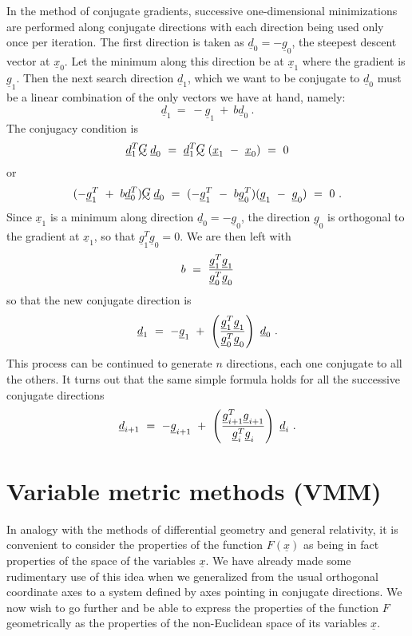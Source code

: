      In the method of conjugate gradients, successive one-dimensional
minimizations are performed along conjugate directions with each direction being used only once per iteration.  The first direction is taken
as ${\underline{d}}_0 = -{\underline{g}}_0$, the steepest descent vector at ${\underline{x}}_0$. 
Let the minimum along this direction be at ${\underline{x}}_1$ where the gradient is
${\underline{g}}_1$.  Then the next  search direction ${\underline{d}}_1$, which we want to be
conjugate to ${\underline{d}}_0$ must be a linear combination of the only vectors we have at hand,
namely:
 $${\underline{d}}_1~=~-{\underline{g}}_1~+~b{\underline{d}}_0~.$$
The conjugacy condition is
 $${\underline{d}}_1^T\UTG{\underline{d}}_0~=~{\underline{d}}_1^T\UTG({\underline{x}}_1~-~
{\underline{x}}_0)~=~0$$
or
$$(-{\underline{g}}_1^T~+~b{\underline{d}}_0^T)\UTG{\underline{d}}_0~=~
(-{\underline{g}}_1^T~-~b{\underline{g}}_0^T)({\underline{g}}_1~-~{\underline{g}}_0)~=~0~.$$
Since ${\underline{x}}_1$ is a minimum along direction ${\underline{d}}_0 = -{\underline{g}}_0$, the
direction ${\underline{g}}_0$ is orthogonal to the gradient at ${\underline{x}}_1$,
 so that ${\underline{g}}_1^T{\underline{g}}_0 = 0$.  We are then left with
 $$b~=~{{\underline{g}}_1^T{\underline{g}}_1\over {\underline{g}}_0^T{\underline{g}}_0}$$
 so that the new conjugate direction is
 $${\underline{d}}_1~=~-{\underline{g}}_1~+~\left(
{{\underline{g}}_1^T{\underline{g}}_1\over {\underline{g}}_0^T{\underline{g}}_0}\right)~
{\underline{d}}_0~.$$ 
This process can be continued to generate $n$ directions, each one conjugate
to all the others.  It turns out that the same simple formula holds
for all the successive conjugate directions
 $${\underline{d}}_{i+1}~=~-{\underline{g}}_{i+1}~+~\left(
{{\underline{g}}_{i+1}^T{\underline{g}}_{i+1}\over {\underline{g}}_i^T{\underline{g}}_i}\right)~
{\underline{d}}_i~.$$ 
 
\section{Variable metric methods (VMM)}
 
     In analogy with the methods of differential geometry and general
relativity, it is convenient to consider the properties of the function
$F({\underline{x}})$ as being in fact properties of the space of the variables ${\underline{x}}$.
 We have already made some rudimentary use of this idea when we generalized
from the usual orthogonal coordinate axes to a system defined by axes
pointing in conjugate directions.  We now wish to go further and be able
to express the properties of the function $F$ geometrically as the properties 
of the non-Euclidean space of its variables ${\underline{x}}$.
 
